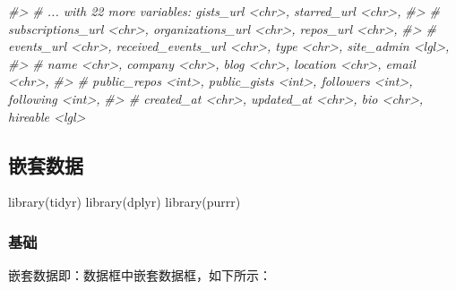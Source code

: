 \documentclass[
]{book}
\newenvironment{Shaded}{\begin{snugshade}}{\end{snugshade}}
\newcommand{\CommentTok}[1]{\textcolor[rgb]{0.56,0.35,0.01}{\textit{#1}}}
\newcommand{\FunctionTok}[1]{\textcolor[rgb]{0.00,0.00,0.00}{#1}}
\newcommand{\NormalTok}[1]{#1}
\begin{document}
\begin{Shaded}
\begin{Highlighting}[]
\CommentTok{\#\textgreater{} \# ... with 22 more variables: gists\_url \textless{}chr\textgreater{}, starred\_url \textless{}chr\textgreater{},}
\CommentTok{\#\textgreater{} \#   subscriptions\_url \textless{}chr\textgreater{}, organizations\_url \textless{}chr\textgreater{}, repos\_url \textless{}chr\textgreater{},}
\CommentTok{\#\textgreater{} \#   events\_url \textless{}chr\textgreater{}, received\_events\_url \textless{}chr\textgreater{}, type \textless{}chr\textgreater{}, site\_admin \textless{}lgl\textgreater{},}
\CommentTok{\#\textgreater{} \#   name \textless{}chr\textgreater{}, company \textless{}chr\textgreater{}, blog \textless{}chr\textgreater{}, location \textless{}chr\textgreater{}, email \textless{}chr\textgreater{},}
\CommentTok{\#\textgreater{} \#   public\_repos \textless{}int\textgreater{}, public\_gists \textless{}int\textgreater{}, followers \textless{}int\textgreater{}, following \textless{}int\textgreater{},}
\CommentTok{\#\textgreater{} \#   created\_at \textless{}chr\textgreater{}, updated\_at \textless{}chr\textgreater{}, bio \textless{}chr\textgreater{}, hireable \textless{}lgl\textgreater{}}
\end{Highlighting}
\end{Shaded}

\hypertarget{ux5d4cux5957ux6570ux636e}{%
\subsection{嵌套数据}\label{ux5d4cux5957ux6570ux636e}}

\begin{Shaded}
\begin{Highlighting}[]
\FunctionTok{library}\NormalTok{(tidyr)}
\FunctionTok{library}\NormalTok{(dplyr)}
\FunctionTok{library}\NormalTok{(purrr)}
\end{Highlighting}
\end{Shaded}

\hypertarget{ux57faux7840-3}{%
\subsubsection{基础}\label{ux57faux7840-3}}

嵌套数据即：数据框中嵌套数据框，如下所示：
\end{document}
